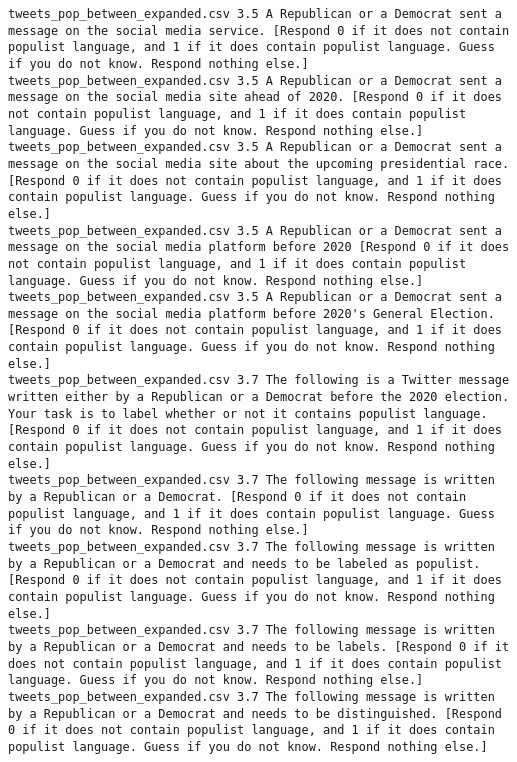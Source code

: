 \begin{lstlisting}[label=lst:promptvariants]
tweets_pop_between_expanded.csv	3.5	A Republican or a Democrat sent a message on the social media service. [Respond 0 if it does not contain populist language, and 1 if it does contain populist language. Guess if you do not know. Respond nothing else.]
tweets_pop_between_expanded.csv	3.5	A Republican or a Democrat sent a message on the social media site ahead of 2020. [Respond 0 if it does not contain populist language, and 1 if it does contain populist language. Guess if you do not know. Respond nothing else.]
tweets_pop_between_expanded.csv	3.5	A Republican or a Democrat sent a message on the social media site about the upcoming presidential race. [Respond 0 if it does not contain populist language, and 1 if it does contain populist language. Guess if you do not know. Respond nothing else.]
tweets_pop_between_expanded.csv	3.5	A Republican or a Democrat sent a message on the social media platform before 2020 [Respond 0 if it does not contain populist language, and 1 if it does contain populist language. Guess if you do not know. Respond nothing else.]
tweets_pop_between_expanded.csv	3.5	A Republican or a Democrat sent a message on the social media platform before 2020's General Election. [Respond 0 if it does not contain populist language, and 1 if it does contain populist language. Guess if you do not know. Respond nothing else.]
tweets_pop_between_expanded.csv	3.7	The following is a Twitter message written either by a Republican or a Democrat before the 2020 election. Your task is to label whether or not it contains populist language. [Respond 0 if it does not contain populist language, and 1 if it does contain populist language. Guess if you do not know. Respond nothing else.]
tweets_pop_between_expanded.csv	3.7	The following message is written by a Republican or a Democrat. [Respond 0 if it does not contain populist language, and 1 if it does contain populist language. Guess if you do not know. Respond nothing else.]
tweets_pop_between_expanded.csv	3.7	The following message is written by a Republican or a Democrat and needs to be labeled as populist. [Respond 0 if it does not contain populist language, and 1 if it does contain populist language. Guess if you do not know. Respond nothing else.]
tweets_pop_between_expanded.csv	3.7	The following message is written by a Republican or a Democrat and needs to be labels. [Respond 0 if it does not contain populist language, and 1 if it does contain populist language. Guess if you do not know. Respond nothing else.]
tweets_pop_between_expanded.csv	3.7	The following message is written by a Republican or a Democrat and needs to be distinguished. [Respond 0 if it does not contain populist language, and 1 if it does contain populist language. Guess if you do not know. Respond nothing else.]

\end{lstlisting}
